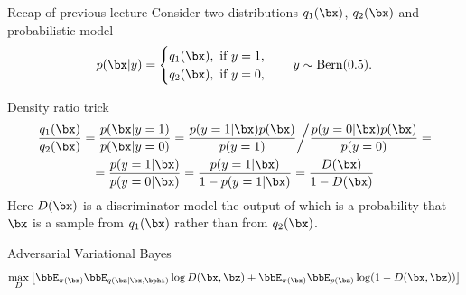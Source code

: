 \begin{frame}{Recap of previous lecture}
	Consider two distributions $q_1(\bx)$, $q_2(\bx)$ and probabilistic model
	\[
		p(\bx | y) = \begin{cases}
			q_1(\bx), \text{ if } y = 1, \\
			q_2(\bx), \text{ if } y = 0,
		\end{cases}
		\quad 
		y \sim \text{Bern}(0.5).
	\]
	\vspace{-0.3cm}
	\begin{block}{Density ratio trick}
		\vspace{-0.7cm}
		{\small
		\begin{multline*}
			\frac{q_1(\bx)}{q_2(\bx)} = \frac{p(\bx | y = 1)}{p(\bx | y = 0)} = \frac{p(y = 1 | \bx) p(\bx)}{p(y=1)} \bigg/ \frac{p(y = 0 | \bx) p(\bx)}{p(y=0)} = \\
			= \frac{p(y = 1 | \bx)}{p(y = 0 | \bx)} = \frac{p(y = 1 | \bx)}{1 - p(y = 1 | \bx)} = \frac{D(\bx)}{1 - D(\bx)}
		\end{multline*}
		}
		Here $D(\bx)$ is a discriminator model the output of which is a probability that $\bx$ is a sample
		from $q_1(\bx)$ rather than from $q_2(\bx)$.
	\end{block}
	\begin{block}{Adversarial Variational Bayes}
		\vspace{-0.6cm}
		\[
			\max_D \left[ \bbE_{\pi(\bx)} \bbE_{q(\bz | \bx, \bphi)} \log D(\bx, \bz) + \bbE_{\pi(\bx)} \bbE_{p(\bz)} \log (1 - D(\bx, \bz)) \right]
		\]
	\end{block}
\end{frame}
